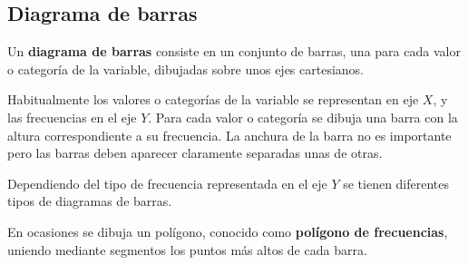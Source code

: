 \documentclass[
  a4paper,
]{scrreport}
\theoremstyle{definition}
\theoremstyle{definition}
\theoremstyle{plain}
\theoremstyle{remark}
\begin{document}
\hypertarget{diagrama-de-barras}{%
\subsection{Diagrama de barras}\label{diagrama-de-barras}}

Un \textbf{diagrama de barras} consiste en un conjunto de barras, una
para cada valor o categoría de la variable, dibujadas sobre unos ejes
cartesianos.

Habitualmente los valores o categorías de la variable se representan en
eje \(X\), y las frecuencias en el eje \(Y\). Para cada valor o
categoría se dibuja una barra con la altura correspondiente a su
frecuencia. La anchura de la barra no es importante pero las barras
deben aparecer claramente separadas unas de otras.

Dependiendo del tipo de frecuencia representada en el eje \(Y\) se
tienen diferentes tipos de diagramas de barras.

En ocasiones se dibuja un polígono, conocido como \textbf{polígono de
frecuencias}, uniendo mediante segmentos los puntos más altos de cada
barra.
\end{document}
